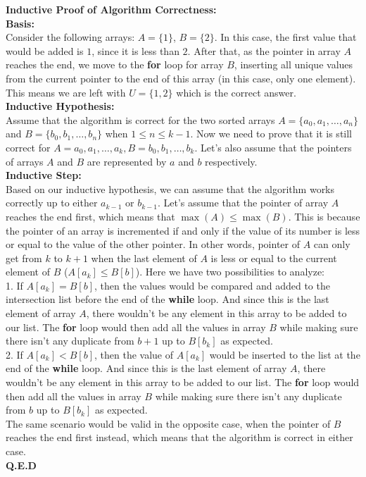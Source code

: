     \textbf{Inductive Proof of Algorithm Correctness:} \\
    \textbf{Basis:} \\
    Consider the following arrays: $A=\{1\}$, $B=\{2\}$. In this case, the first value that would be added is $1$, since it is less than $2$. After that, as the
    pointer in array $A$ reaches the end, we move to the \textbf{for} loop for array $B$, inserting all unique values from the current pointer to
    the end of this array (in this case, only one element). This means we are left with $U=\{1, 2\}$ which is the correct answer. \\
    \textbf{Inductive Hypothesis:} \\
    Assume that the algorithm is correct for the two sorted arrays $A=\{a_0, a_1, \ldots, a_n\}$ and $B=\{b_0, b_1, \ldots, b_n\}$ when $1 \leq n \leq k-1$.
    Now we need to prove that it is still correct for $A={a_0, a_1, \ldots, a_k}, B={b_0, b_1, \ldots, b_k}$. Let's also assume that the pointers
    of arrays $A$ and $B$ are represented by $a$ and $b$ respectively. \\ 
    \textbf{Inductive Step:} \\
    Based on our inductive hypothesis, we can assume that the algorithm works correctly up to either $a_{k-1}$ or $b_{k-1}$. Let's assume that the pointer of 
    array $A$ reaches the end first, which means that $\max(A) \leq \max(B)$. This is because the pointer of an array is incremented if and only if the value of its number
    is less or equal to the value of the other pointer. In other words, pointer of $A$ can only get from $k$ to $k+1$ when the last element of $A$ is less or equal to
    the current element of $B$ ($A[a_k] \leq B[b]$). Here we have two possibilities to analyze: \\
    1. If $A[a_k] = B[b]$, then the values would be compared and added to the intersection list before the end of the \textbf{while} loop. And since this is the last element of
    array $A$, there wouldn't be any element in this array to be added to our list. The \textbf{for} loop would then add all the values in array $B$ while making sure there isn't any duplicate
    from $b+1$ up to $B[b_k]$ as expected. \\
    2. If $A[a_k] < B[b]$, then the value of $A[a_k]$ would be inserted to the list at the end of the \textbf{while} loop. And since this is the last element of
    array $A$, there wouldn't be any element in this array to be added to our list. The \textbf{for} loop would then add all the values in array $B$ while making sure there isn't any duplicate
    from $b$ up to $B[b_k]$ as expected. \\
    The same scenario would be valid in the opposite case, when the pointer of $B$ reaches the end first instead, which means that the algorithm is correct in either case.\\
    \textbf{Q.E.D}

